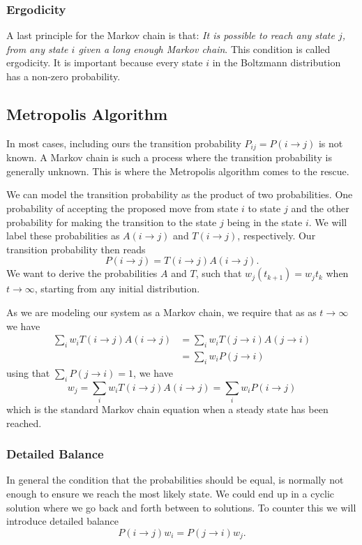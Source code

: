 \documentclass[%
reprint,
nofootinbib,
amsmath,amssymb,
aps,
]{revtex4-1}
\begin{document}
\subsubsection{Ergodicity}%
A last principle for the Markov chain is that:  
\textit{It is possible to reach any state $j$, from any state $i$ given a long enough Markov chain}. This condition is  called ergodicity. It is important because every state $i$ in the Boltzmann distribution has a non-zero probability. 
\subsection{Metropolis Algorithm}%
In most cases, including ours the transition probability $P_{ij} = P(i\rightarrow j)$ is not known.  A Markov chain is such a process where the transition probability is generally unknown. This is where the Metropolis algorithm comes to the rescue. 

We can model the transition probability as the product of two probabilities. One probability of accepting the proposed move from state $i$ to state $j$ and the other probability for making the transition to the state $j$ being in the state $i$\cite{morten}. We will label these probabilities as $A(i \rightarrow j)$ and $T(i \rightarrow j)$, respectively. Our transition probability then reads 
\begin{equation}
	P(i \rightarrow j) = T(i \rightarrow j)A(i \rightarrow j).
\end{equation}
We want to derive the probabilities $A$ and $T$, such that $w_j(t_{k+1}) = w_j{t_k}$ when $t\rightarrow\infty$, starting from any initial distribution. 

As we are modeling our system as a Markov chain, we require that as as $t\rightarrow\infty$ we have 
\begin{align}
	\sum_i w_iT(i \rightarrow j)A(i \rightarrow j) &=\sum_i w_iT(j \rightarrow i)A(j \rightarrow i)\\
	&= 	\sum_i w_iP(j \rightarrow i)
\end{align}
using that $\sum_i P(j\rightarrow i) = 1$, we have 
\begin{equation}
	w_j = \sum_i w_iT(i\rightarrow j)A(i\rightarrow j) = \sum_i w_iP(i\rightarrow j)
\end{equation}
which is the standard Markov chain equation when a steady state has been reached. 

\subsubsection{Detailed Balance} %
In general the condition that the probabilities should be equal, is normally not enough to ensure we reach the most likely state. We could end up in a cyclic solution where we go back and forth between to solutions. To counter this we will introduce detailed balance\cite{LarsOnsagerIrreversible}
\begin{equation}
	P(i\rightarrow j)w_i = P(j\rightarrow i)w_j.
\end{equation}
\end{document}

